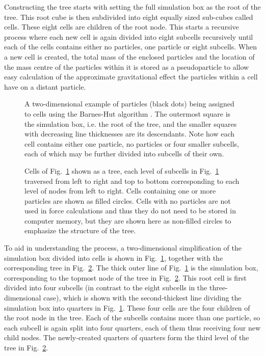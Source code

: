 \documentclass[english, oneside]{HYgradu}
\begin{document}
Constructing the tree starts with setting the full simulation box as the root of the tree. This root cube is then subdivided into eight equally sized sub-cubes called cells. These eight cells are children of the root node. This starts a recursive process where each new cell is again divided into eight subcells recursively until each of the cells contains either no particles, one particle or eight subcells. When a new cell is created, the total mass of the enclosed particles and the location of the mass centre of the particles within it is stored as a pseudoparticle to allow easy calculation of the approximate gravitational effect the particles within a cell have on a distant particle.

\begin{figure}
    \centering
    
    \caption{A two-dimensional example of particles (black dots) being assigned to cells using the Barnes-Hut algorithm \citep{barnes1986hierarchical}. The outermost square is the simulation box, i.e. the root of the tree, and the smaller squares with decreasing line thicknesses are its descendants. Note how each cell contains either one particle, no particles or four smaller subcells, each of which may be further divided into subcells of their own.}\label{fig:tree-box}
\end{figure}

\begin{figure}
    \centering
    \def\svgwidth{\columnwidth}
    
    \caption{Cells of Fig.\ \ref{fig:tree-box} shown as a tree, each level of subcells in Fig.\ \ref{fig:tree-box} traversed from left to right and top to bottom corresponding to each level of nodes from left to right. Cells containing one or more particles are shown as filled circles. Cells with no particles are not used in force calculations and thus they do not need to be stored in computer memory, but they are shown here as non-filled circles to emphasize the structure of the tree.}\label{fig:tree}
\end{figure}

To aid in understanding the process, a two-dimensional simplification of the simulation box divided into cells is shown in Fig.\ \ref{fig:tree-box}, together with the corresponding tree in Fig.\ \ref{fig:tree}. The thick outer line of Fig.\ \ref{fig:tree-box} is the simulation box, corresponding to the topmost node of the tree in Fig.\ \ref{fig:tree}. This root cell is first divided into four subcells (in contrast to the eight subcells in the three-dimensional case), which is shown with the second-thickest line dividing the simulation box into quarters in Fig.\ \ref{fig:tree-box}. These four cells are the four children of the root node in the tree. Each of the subcells contains more than one particle, so each subcell is again split into four quarters, each of them thus receiving four new child nodes. The newly-created quarters of quarters form the third level of the tree in Fig.\ \ref{fig:tree}.
\end{document}
